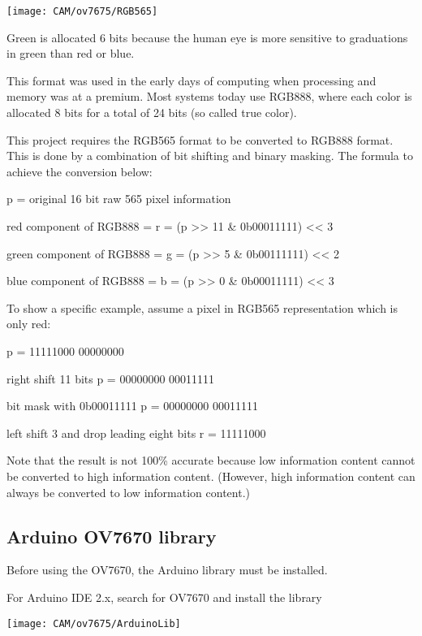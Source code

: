 \begin{center}
    \texttt{[image: CAM/ov7675/RGB565]}
\end{center}
    
Green is allocated 6 bits because the human eye is more sensitive to graduations in green than red or blue.

This format was used in the early days of computing when processing and memory was at a premium. Most systems today use RGB888, where each color is allocated 8 bits for a total of 24 bits (so called true color).

This project requires the RGB565 format to be converted to RGB888 format. This is done by a combination of bit shifting and binary masking. The formula to achieve the conversion below:

p = original 16 bit raw 565 pixel information

red component of RGB888 = r = (p >> 11 \& 0b00011111) << 3

green component of RGB888 = g = (p >> 5 \& 0b00111111) << 2

blue component of RGB888 = b = (p >> 0 \& 0b00011111) << 3

To show a specific example, assume a pixel in RGB565 representation which is only red:

p = 11111000 00000000

right shift 11 bits p = 00000000 00011111

bit mask with 0b00011111 p = 00000000 00011111

left shift 3 and drop leading eight bits r = 11111000

Note that the result is not 100\% accurate because low information content cannot be converted to high information content. (However, high information content can always be converted to low information content.)

\subsection{Arduino OV7670 library}
    Before using the OV7670, the Arduino library must be installed.
    
    For Arduino IDE 2.x, search for OV7670 and install the library    
    
\begin{center}
    \texttt{[image: CAM/ov7675/ArduinoLib]}
\end{center}

